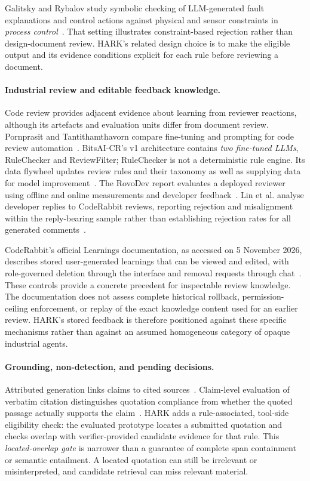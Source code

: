\documentclass[computers,article,submit,moreauthors]{Definitions/mdpi}
\begin{document}
Galitsky and Rybalov study symbolic checking of LLM-generated fault explanations and control actions against physical and sensor constraints in \emph{process control}~\cite{neuro2026}. That setting illustrates constraint-based rejection rather than design-document review. HARK's related design choice is to make the eligible output and its evidence conditions explicit for each rule before reviewing a document.

\paragraph{Industrial review and editable feedback knowledge.}
Code review provides adjacent evidence about learning from reviewer reactions, although its artefacts and evaluation units differ from document review. Pornprasit and Tantithamthavorn compare fine-tuning and prompting for code review automation~\cite{pornprasit2024}. BitsAI-CR's v1 architecture contains \emph{two fine-tuned LLMs}, RuleChecker and ReviewFilter; RuleChecker is not a deterministic rule engine. Its data flywheel updates review rules and their taxonomy as well as supplying data for model improvement~\cite{sun2025}. The RovoDev report evaluates a deployed reviewer using offline and online measurements and developer feedback~\cite{rovo2026}. Lin et al. analyse developer replies to CodeRabbit reviews, reporting rejection and misalignment within the reply-bearing sample rather than establishing rejection rates for all generated comments~\cite{lin2026}.

CodeRabbit's official Learnings documentation, as accessed on 5 November 2026, describes stored user-generated learnings that can be viewed and edited, with role-governed deletion through the interface and removal requests through chat~\cite{coderabbitLearnings}. These controls provide a concrete precedent for inspectable review knowledge. The documentation does not assess complete historical rollback, permission-ceiling enforcement, or replay of the exact knowledge content used for an earlier review. HARK's stored feedback is therefore positioned against these specific mechanisms rather than against an assumed homogeneous category of opaque industrial agents.

\paragraph{Grounding, non-detection, and pending decisions.}
Attributed generation links claims to cited sources~\cite{gao2023}. Claim-level evaluation of verbatim citation distinguishes quotation compliance from whether the quoted passage actually supports the claim~\cite{zhang2026cite}. HARK adds a rule-associated, tool-side eligibility check: the evaluated prototype locates a submitted quotation and checks overlap with verifier-provided candidate evidence for that rule. This \emph{located-overlap gate} is narrower than a guarantee of complete span containment or semantic entailment. A located quotation can still be irrelevant or misinterpreted, and candidate retrieval can miss relevant material.
\end{document}
